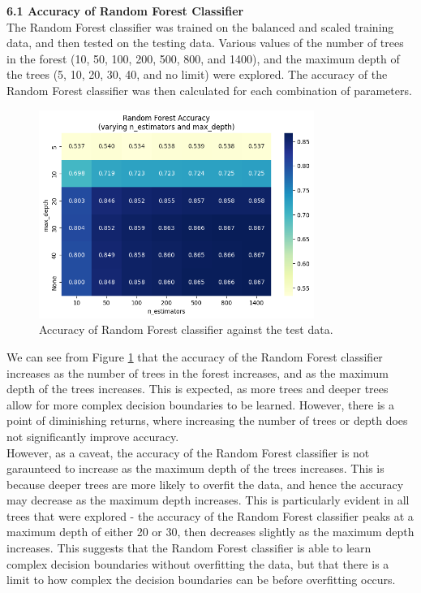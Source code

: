 \documentclass[12pt]{article}
\begin{document}
\vspace{20pt}

\textbf{6.1 Accuracy of Random Forest Classifier}
\\
The Random Forest classifier was trained on the balanced and scaled training data, and then tested on the testing data. Various values of the number of trees in the forest (10, 50, 100, 200, 500, 800, and 1400), and the maximum depth of the trees (5, 10, 20, 30, 40, and no limit) were explored. The accuracy of the Random Forest classifier was then calculated for each combination of parameters.

\begin{figure}[H]
\centering
\includegraphics[width=0.8\textwidth]{figures/rf_accuracy.png}
\caption{Accuracy of Random Forest classifier against the test data.}
\label{fig:rf_accuracy}
\end{figure}

We can see from Figure \ref{fig:rf_accuracy} that the accuracy of the Random Forest classifier increases as the number of trees in the forest increases, and as the maximum depth of the trees increases. This is expected, as more trees and deeper trees allow for more complex decision boundaries to be learned. However, there is a point of diminishing returns, where increasing the number of trees or depth does not significantly improve accuracy.
\\
However, as a caveat, the accuracy of the Random Forest classifier is not garaunteed to increase as the maximum depth of the trees increases. This is because deeper trees are more likely to overfit the data, and hence the accuracy may decrease as the maximum depth increases. This is particularly evident in all trees that were explored - the accuracy of the Random Forest classifier peaks at a maximum depth of either 20 or 30, then decreases slightly as the maximum depth increases. This suggests that the Random Forest classifier is able to learn complex decision boundaries without overfitting the data, but that there is a limit to how complex the decision boundaries can be before overfitting occurs.
\end{document}
